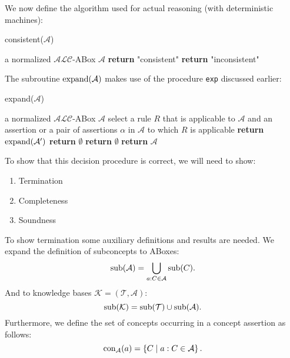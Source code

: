 \begin{definition}
	We now define the algorithm used for actual reasoning (with deterministic machines):
	\begin{algorithm}[H]
		\caption{consistent($\mathcal{A}$)}
		\label{alg:consistent}
		\begin{algorithmic}[1]
			\Require a normalized $\mathcal{ALC}$-ABox $\mathcal{A}$
				\State \textbf{return} "consistent"
			\Else{}
				\State \textbf{return} "inconsistent"
			\EndIf
		\end{algorithmic}
	\end{algorithm}
	The subroutine $\operatorname{\text{expand}}(\mathcal{A})$ makes use of the procedure \texttt{exp} discussed earlier:
	\begin{algorithm}[H]
		\caption{expand($\mathcal{A}$)}
		\label{alg:expand}
		\begin{algorithmic}[1]
			\Require a normalized $\mathcal{ALC}$-ABox $\mathcal{A}$ 
				\State select a rule $R$ that is applicable to $\mathcal{A}$ and an assertion or 
				\State a pair of assertions $\alpha$ in $\mathcal{A}$ to which $R$ is applicable
					\State \textbf{return} $\operatorname{\text{expand}}(\mathcal{A}')$
				\Else
						\State \textbf{return} $\emptyset$
				\EndIf
			\Else
					\State \textbf{return} $\emptyset$
				\Else
					\State \textbf{return} $\mathcal{A}$
				\EndIf
			\EndIf
		\end{algorithmic}
	\end{algorithm}
\end{definition}
To show that this decision procedure is correct, we will need to show:
\begin{enumerate}
	\item Termination
	\item Completeness
	\item Soundness
\end{enumerate}

To show termination some auxiliary definitions and results are needed.
We expand the definition of subconcepts to ABoxes:
\[
	\operatorname{\text{sub}}(\mathcal{A}) = \bigcup_{a:C \in \mathcal{A}} \operatorname{\text{sub}}(C)
.\]
And to knowledge bases $\mathcal{K} = (\mathcal{T}, \mathcal{A})$:
\[
	\operatorname{\text{sub}}(\mathcal{K}) = \operatorname{\text{sub}}(\mathcal{T}) \cup \operatorname{\text{sub}}(\mathcal{A})
.\]
Furthermore, we define the set of concepts occurring in a concept assertion as follows:
\[
	\operatorname{\text{con}}_{\mathcal{A}}(a) = \left\{ C \mid a : C \in \mathcal{A} \right\}
.\]

